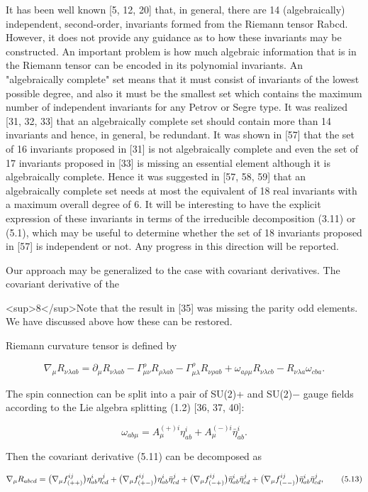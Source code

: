 \documentclass{article}
\begin{document}
It has been well known [5, 12, 20] that, in general, there are 14 (algebraically) independent, second-order, invariants formed from the Riemann tensor Rabcd. However, it does not provide any guidance as to how these invariants may be constructed. An important problem is how much algebraic information that is in the Riemann tensor can be encoded in its polynomial invariants. An "algebraically complete" set means that it must consist of invariants of the lowest possible degree, and also it must be the smallest set which contains the maximum number of independent invariants for any Petrov or Segre type. It was realized [31, 32, 33] that an algebraically complete set should contain more than 14 invariants and hence, in general, be redundant. It was shown in [57] that the set of 16 invariants proposed in [31] is not algebraically complete and even the set of 17 invariants proposed in [33] is missing an essential element although it is algebraically complete. Hence it was suggested in [57, 58, 59] that an algebraically complete set needs at most the equivalent of 18 real invariants with a maximum overall degree of 6. It will be interesting to have the explicit expression of these invariants in terms of the irreducible decomposition (3.11) or (5.1), which may be useful to determine whether the set of 18 invariants proposed in [57] is independent or not. Any progress in this direction will be reported.

Our approach may be generalized to the case with covariant derivatives. The covariant derivative of the

<sup>8</sup>Note that the result in [35] was missing the parity odd elements. We have discussed above how these can be restored.

Riemann curvature tensor is defined by

$$\nabla_{\mu}R_{\nu\lambda ab}=\partial_{\mu}R_{\nu\lambda ab}-\Gamma^{\rho}_{\mu\nu}R_{\rho\lambda ab}-\Gamma^{\rho}_{\mu\lambda}R_{\nu\rho ab}+\omega_{a\rho\mu}R_{\nu\lambda cb}-R_{\nu\lambda a}\omega_{cba}.\tag{5.11}$$

The spin connection can be split into a pair of SU(2)+ and SU(2)− gauge fields according to the Lie algebra splitting (1.2) [36, 37, 40]:

$$\omega_{ab\mu}=A^{(+)i}_{\mu}\eta^{i}_{ab}+A^{(-)i}_{\mu}\bar{\eta}^{i}_{ab}.\tag{5.12}$$

Then the covariant derivative (5.11) can be decomposed as

$$\nabla_{\mu}R_{abcd}=\big{(}\nabla_{\mu}f^{ij}_{(++)}\big{)}\eta^{i}_{ab}\eta^{j}_{cd}+\big{(}\nabla_{\mu}f^{ij}_{(+-)}\big{)}\eta^{i}_{ab}\bar{\eta}^{j}_{cd}+\big{(}\nabla_{\mu}f^{ij}_{(-+)}\big{)}\bar{\eta}^{i}_{ab}\bar{\eta}^{j}_{cd}+\big{(}\nabla_{\mu}f^{ij}_{(--)}\big{)}\bar{\eta}^{i}_{ab}\bar{\eta}^{j}_{cd},\tag{5.13}$$
\end{document}
